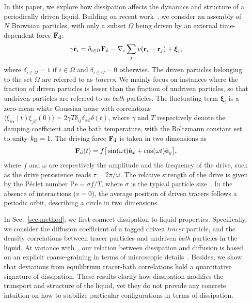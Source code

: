 \documentclass[pre, superscriptaddress, twocolumn,pre]{revtex4-1}
\begin{document}
In this paper, we explore how dissipation affects the dynamics and structure of a periodically driven liquid. Building on recent work~\cite{Han2016, delJunco2018}, we consider an assembly of $N$ Brownian particles, with only a subset $\Omega$ being driven by an external time-dependent force ${\bf F}_{\rm d}$:
\begin{equation}\label{eq:dyn}
	\gamma\dot{\bf r}_i = \delta_{i\in\Omega}{\bf F}_{\rm d} - \nabla_i \sum_j v({\bf r}_i-{\bf r}_j) + {\boldsymbol\xi}_i ,
\end{equation}
where $\delta_{i\in\Omega}=1$ if $i\in\Omega$ and $\delta_{i\in\Omega}=0$ otherwise. The driven particles belonging to the set $\Omega$ are referred to as \textit{tracers}. We mainly focus on instances where the fraction of driven particles is lesser than the fraction of undriven particles, so that undriven particles are referred to as \textit{bath} particles. The fluctuating term ${\boldsymbol\xi}_i$ is a zero-mean white Gaussian noise with correlations $\langle\xi_{i\alpha}(t)\xi_{j\beta}(0)\rangle=2\gamma T\delta_{ij}\delta_{\alpha\beta}\delta(t)$, where $\gamma$ and $T$ respectively denote the damping coefficient and the bath temperature, with the Boltzmann constant set to unity $k_{\rm B}=1$. The driving force ${\bf F}_\text{d}$ is taken in two dimensions as
\begin{equation}\label{eq:theta}
	{\bf F}_{\rm d}(t) = f \big[\sin(\omega t) \hat{\bf e}_x + \cos(\omega t)\hat{\bf e}_y \big] ,
\end{equation}
where $f$ and $\omega$ are respectively the amplitude and the frequency of the drive, such as the drive persistence reads $\tau=2\pi/\omega$. The relative strength of the drive is given by the P\'eclet number $\text{Pe} = \sigma f/T$, where $\sigma$ is the typical particle size~\cite{Han2016, delJunco2018}. In the absence of interactions ($v=0$), the average position of driven tracers follows a periodic orbit, describing a circle in two dimensions.


In Sec.~\ref{sec:method}, we first connect dissipation to liquid properties. Specifically, we consider the diffusion coefficient of a tagged driven \textit{tracer} particle, and the density correlations between tracer particles and undriven \textit{bath} particles in the liquid. At variance with~\cite{delJunco2018}, our relation between dissipation and diffusion is based on an explicit coarse-graining in terms of microscopic details~\cite{Dean1996, Demery2011, Demery2014}. Besides, we show that deviations from equilibrium tracer-bath correlations hold a quantitative signature of dissipation. These results clarify how dissipation modifies the transport and structure of the liquid, yet they do not provide any concrete intuition on how to stabilize particular configurations in terms of dissipation.
\end{document}
